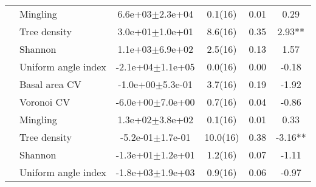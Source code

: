 {\begin{longtable}{llcccS[table-format=-2.2, table-space-text-post = {***}]}
   & Mingling &  6.6e+03$\pm$2.3e+04 & 0.1(16) & 0.01 & 0.29 \\* 
   & Tree density &  3.0e+01$\pm$1.0e+01 & 8.6(16) & 0.35 & 2.93** \\* 
   & Shannon &  1.1e+03$\pm$6.9e+02 & 2.5(16) & 0.13 & 1.57 \\* 
   & Uniform angle index & -2.1e+04$\pm$1.1e+05 & 0.0(16) & 0.00 & -0.18 \\ 
   \midrule
{} & Basal area CV & -1.0e+00$\pm$5.3e-01 & 3.7(16) & 0.19 & -1.92 \\* 
   & Voronoi CV & -6.0e+00$\pm$7.0e+00 & 0.7(16) & 0.04 & -0.86 \\* 
   & Mingling &  1.3e+02$\pm$3.8e+02 & 0.1(16) & 0.01 & 0.33 \\* 
   & Tree density & -5.2e-01$\pm$1.7e-01 & 10.0(16) & 0.38 & -3.16** \\* 
   & Shannon & -1.3e+01$\pm$1.2e+01 & 1.2(16) & 0.07 & -1.11 \\* 
   & Uniform angle index & -1.8e+03$\pm$1.9e+03 & 0.9(16) & 0.06 & -0.97 \\ 
\end{longtable}
}

